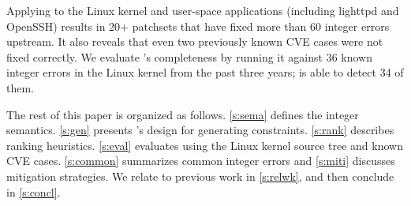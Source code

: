 Applying \sys to the Linux kernel and user-space applications
(including lighttpd and OpenSSH) results in 20+ patchsets that have
fixed more than 60 integer errors upstream.  It also reveals that
even two previously known CVE cases were not fixed correctly.
%
We evaluate \sys's completeness by running it against 36 known
integer errors in the Linux kernel from the past three years; \sys
is able to detect 34 of them.

The rest of this paper is organized as follows. \autoref{s:sema}
defines the integer semantics.  \autoref{s:gen} presents \sys's
design for generating constraints.  \autoref{s:rank} describes
ranking heuristics.  \autoref{s:eval} evaluates \sys using the Linux
kernel source tree and known CVE cases.  \autoref{s:common} summarizes
common integer errors and \autoref{s:miti} discusses mitigation
strategies.  We relate \sys to previous work in \autoref{s:relwk},
and then conclude in \autoref{s:concl}.
